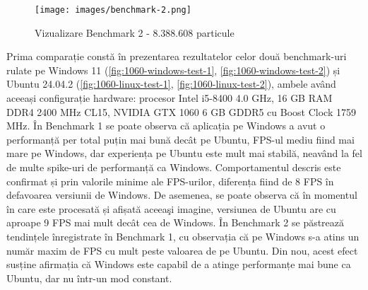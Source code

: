 \begin{figure}[ht]
    \centering
    \texttt{[image: images/benchmark-2.png]}
    \caption{Vizualizare Benchmark 2 - 8.388.608 particule}
    \label{fig:benchmark-2}
\end{figure}

Prima comparație constă în prezentarea rezultatelor celor două benchmark-uri rulate pe Windows 11 (\autoref{fig:1060-windows-test-1}, \autoref{fig:1060-windows-test-2}) și Ubuntu 24.04.2 (\autoref{fig:1060-linux-test-1}, \autoref{fig:1060-linux-test-2}), ambele având aceeași configurație hardware: procesor Intel i5-8400 4.0 GHz, 16 GB RAM DDR4 2400 MHz CL15, NVIDIA GTX 1060 6 GB GDDR5 cu Boost Clock 1759 MHz. În Benchmark 1 se poate observa că aplicația pe Windows a avut o performanță per total puțin mai bună decât pe Ubuntu, FPS-ul mediu fiind mai mare pe Windows, dar experiența pe Ubuntu este mult mai stabilă, neavând la fel de multe spike-uri de performanță ca Windows. Comportamentul descris este confirmat și prin valorile minime ale FPS-urilor, diferența fiind de 8 FPS în defavoarea versiunii de Windows. De asemenea, se poate observa că în momentul în care este procesată și afișată aceeaşi imagine, versiunea de Ubuntu are cu aproape 9 FPS mai mult decât cea de Windows. În Benchmark 2 se păstrează tendințele înregistrate în Benchmark 1, cu observația că pe Windows s-a atins un număr maxim de FPS cu mult peste valoarea de pe Ubuntu. Din nou, acest efect susține afirmația că Windows este capabil de a atinge performanțe mai bune ca Ubuntu, dar nu într-un mod constant. 

